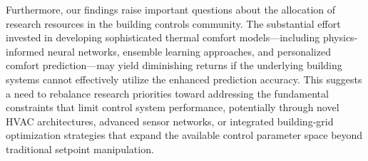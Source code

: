 Furthermore, our findings raise important questions about the allocation of research resources in the building controls community. The substantial effort invested in developing sophisticated thermal comfort models—including physics-informed neural networks, ensemble learning approaches, and personalized comfort prediction—may yield diminishing returns if the underlying building systems cannot effectively utilize the enhanced prediction accuracy. This suggests a need to rebalance research priorities toward addressing the fundamental constraints that limit control system performance, potentially through novel HVAC architectures, advanced sensor networks, or integrated building-grid optimization strategies that expand the available control parameter space beyond traditional setpoint manipulation.